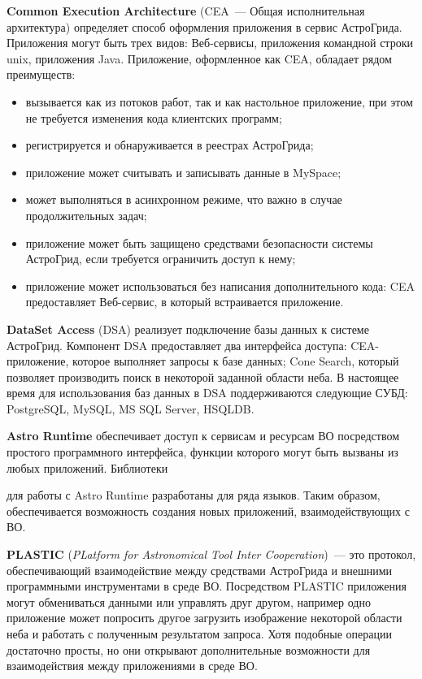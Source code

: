 \begin{multicols}{2}
     \textbf{Common Execution Architecture} (CEA~--- Общая исполнительная
архитектура) определяет способ оформления приложения в сервис АстроГрида.
Приложения могут быть трех видов: Веб-сервисы, приложения командной строки unix,
приложения Java. Приложение, оформленное как CEA, обладает рядом преимуществ:
     \begin{itemize}
\item вызывается как из потоков работ, так и как настольное приложение, при этом не
требуется изменения кода клиентских программ;
\item регистрируется и обнаруживается в реестрах Аст\-ро\-Грида;
\item приложение может считывать и записывать данные в MySpace;
\item может выполняться в асинхронном режиме, что важно в случае
продолжительных задач;
\item приложение может быть защищено средствами безопасности системы
АстроГрид, если требуется ограничить доступ к нему;
\item приложение может использоваться без написания дополнительного кода: CEA
предоставляет Веб-сервис, в который встраивается приложение.
\end{itemize}

 \textbf{DataSet Access} (DSA) реализует подключение базы данных к
системе АстроГрид. Компонент DSA предоставляет два интерфейса доступа: CEA-при\-ло\-же\-ние,
которое выполняет запросы к базе данных; Cone Search, который позволяет производить
поиск в некоторой заданной области неба. В настоящее время для использования баз
данных в DSA поддерживаются следующие СУБД: PostgreSQL, MySQL, MS SQL Server,
HSQLDB.

\textbf{Astro Runtime} обеспечивает доступ к сервисам и ресурсам ВО
посредством простого программного интерфейса, функции которого могут быть вызваны
из любых приложений.
Библиотеки\linebreak
\vspace*{-12pt}

\pagebreak

\noindent
 для работы с Astro Runtime разработаны для ряда
языков. Таким образом, обеспечивается возможность создания новых приложений,
взаимодействующих с ВО.

     \textbf{PLASTIC} (\textit{PLatform for Astronomical Tool Inter %
Cooperation})~--- это протокол, обеспе\-чи\-ва\-ющий взаимодействие между средствами
АстроГрида и внешними программными инструментами в среде ВО. Посредством
PLASTIC приложения могут обмениваться данными или управлять друг другом,
например одно приложение может попросить другое загрузить изображение некоторой
области неба и работать с полученным результатом запроса. Хотя подобные операции
достаточно просты, но они открывают дополнительные возможности для взаимодействия
между приложениями в среде ВО.


\end{multicols}
